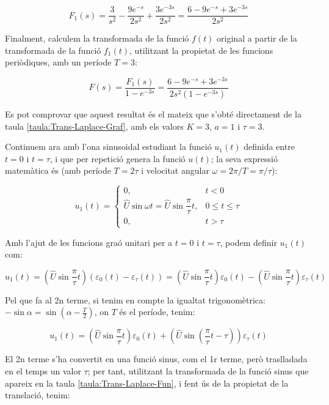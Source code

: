 \begin{exemple}[\CalcTransfLaplace{}]
    \[
        F_1(s) = \frac{3}{s^2} - \frac{9 e^{-s}}{2 s^2} + \frac{3 e^{-3s}}{2
        s^2} =\frac{6-9e^{-s}+3e^{-3s}}{2s^2}
    \]

    Finalment, calculem la transformada de la funció $f(t)$ original a
    partir de la transformada de la funció $f_1(t)$, utilitzant la
    propietat de les funcions periòdiques, amb un període $T=3$:

    \[
        F(s) = \frac{F_1(s)}{1-e^{-3s}} = \frac{6-9e^{-s}+3e^{-3s}}{2s^2(1-e^{-3s}) }
    \]

    Es pot comprovar que aquest resultat és el mateix que s'obté directament de la taula \vref{taula:Trans-Laplace-Graf}, amb els valors $K=3$, $a=1$ i $\tau=3$.

    Continuem ara  amb l'ona sinusoidal estudiant la funció $u_1(t)$
    definida entre $t=0$ i $t=\tau$, i que per repetició genera la
    funció $u(t)$; la seva expressió matemàtica és (amb període $T=
    2\tau$ i velocitat angular $\omega= 2\pi/T  = \pi/\tau$):

    \[
        u_1(t) = \begin{cases} 0, & t < 0\\ \hat{U}\sin\omega t =
        \hat{U}\sin\dfrac{\pi}{\tau}t,  & 0 \leq t \leq \tau \\ 0, & t > \tau \end{cases}
    \]


    Amb l'ajut de les funcions graó unitari per a $t=0$ i $t=\tau$, podem
    definir $u_1(t)$ com:

    \[
        u_1(t)=\left(\hat{U}\sin\frac{\pi}{\tau}t\right)(\varepsilon_0(t)-\varepsilon_\tau(t))
        =\left(\hat{U}\sin\frac{\pi}{\tau}t\right)\varepsilon_0(t) - \left(\hat{U}\sin\frac{\pi}{\tau}t\right)\varepsilon_\tau(t)
    \]

    Pel que fa al 2n  terme, si tenim en compte la igualtat
    trigonomètrica: $-\sin \alpha = \sin(\alpha-\frac{T}{2})$, on $T$ és
    el període, tenim:

    \[
        u_1(t) = \left(\hat{U}\sin\frac{\pi}{\tau}t\right)\varepsilon_0(t) +
        \left(\hat{U}\sin\left(\frac{\pi}{\tau}t-\tau\right)\right)\varepsilon_\tau(t)
    \]

    El 2n terme s'ha convertit en una funció sinus, com el 1r terme,
    però traslladada en el temps un valor $\tau$; per tant, utilitzant la
    transformada de la funció sinus que apareix en la taula
    \vref{taula:Trans-Laplace-Fun}, i fent ús de la propietat de la
    translació, tenim:


\end{exemple}
